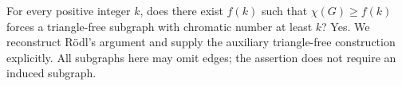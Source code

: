 For every positive integer \(k\), does there exist \(f(k)\) such that \(\chi(G)\geq f(k)\) forces a triangle-free subgraph with chromatic number at least \(k\)?
Yes. We reconstruct R\"odl's argument and supply the auxiliary triangle-free construction explicitly. All subgraphs here may omit edges; the assertion does not require an induced subgraph.
